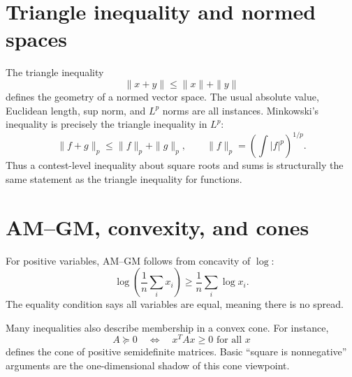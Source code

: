 \section{Triangle inequality and normed spaces}

The triangle inequality
\[
  \|x+y\|\le \|x\|+\|y\|
\]
defines the geometry of a normed vector space.  The usual absolute value, Euclidean length, sup norm, and \(L^p\) norms are all instances.  Minkowski's inequality is precisely the triangle inequality in \(L^p\):
\[
  \|f+g\|_p\le \|f\|_p+\|g\|_p,
  \qquad
  \|f\|_p=\left(\int |f|^p\right)^{1/p}.
\]
Thus a contest-level inequality about square roots and sums is structurally the same statement as the triangle inequality for functions.

\section{AM--GM, convexity, and cones}

For positive variables, AM--GM follows from concavity of \(\log\):
\[
  \log\left(\frac1n\sum_i x_i\right)\ge \frac1n\sum_i\log x_i.
\]
The equality condition says all variables are equal, meaning there is no spread.

Many inequalities also describe membership in a convex cone.  For instance,
\[
  A\succeq0\quad\Longleftrightarrow\quad x^TAx\ge0\text{ for all }x
\]
defines the cone of positive semidefinite matrices.  Basic ``square is nonnegative'' arguments are the one-dimensional shadow of this cone viewpoint.
